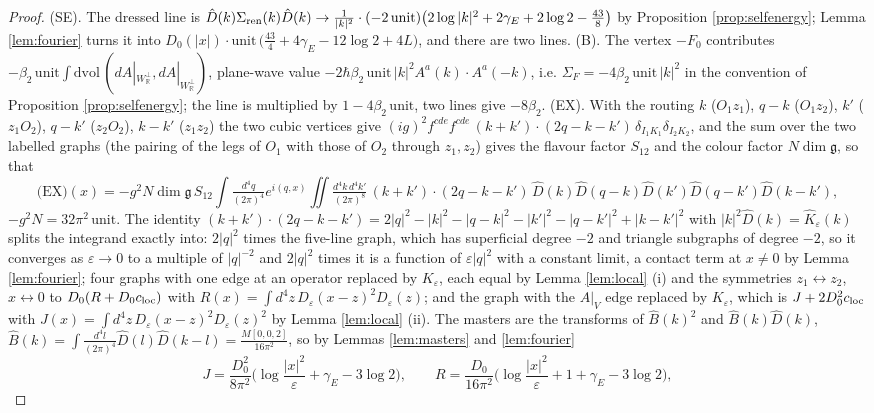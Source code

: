 \documentclass[11pt]{article}
\theoremstyle{plain}
\theoremstyle{definition}
\numberwithin{equation}{section}
\newcommand{\Wp}{W_{\mathbb R}^\perp}
\begin{document}
\begin{proof}
(SE). The dressed line is $\hat D(k)\Sigma_{\rm ren}(k)\hat D(k)\to\frac{1}{|k|^2}\cdot(-2\,\mathrm{unit})\big(2\log|k|^2+2\gamma_E+2\log2-\tfrac{43}8\big)$ by Proposition \ref{prop:selfenergy}; Lemma \ref{lem:fourier} turns it into $D_0(|x|)\cdot\mathrm{unit}\,\big(\tfrac{43}4+4\gamma_E-12\log2+4L\big)$, and there are two lines. (B). The vertex $-F_0$ contributes $-\beta_2\,\mathrm{unit}\int\mathrm{dvol}\,(dA|_{\Wp},dA|_{\Wp})$, plane-wave value $-2\hbar\beta_2\,\mathrm{unit}\,|k|^2A^a(k)\cdot A^a(-k)$, i.e. $\Sigma_F=-4\beta_2\,\mathrm{unit}\,|k|^2$ in the convention of Proposition \ref{prop:selfenergy}; the line is multiplied by $1-4\beta_2\,\mathrm{unit}$, two lines give $-8\beta_2$. (EX). With the routing $k$ ($O_1z_1$), $q-k$ ($O_1z_2$), $k'$ ($z_1O_2$), $q-k'$ ($z_2O_2$), $k-k'$ ($z_1z_2$) the two cubic vertices give $(ig)^2f^{cde}f^{cde}\,(k+k')\cdot(2q-k-k')\,\delta_{I_1K_1}\delta_{I_2K_2}$, and the sum over the two labelled graphs (the pairing of the legs of $O_1$ with those of $O_2$ through $z_1,z_2$) gives the flavour factor $S_{12}$ and the colour factor $N\dim\mathfrak g$, so that
\[
\text{(EX)}(x)=-g^2N\dim\mathfrak g\,S_{12}\int\tfrac{d^4q}{(2\pi)^4}e^{i(q,x)}\iint\tfrac{d^4k\,d^4k'}{(2\pi)^8}\,(k+k')\cdot(2q-k-k')\,\hat D(k)\hat D(q-k)\hat D(k')\hat D(q-k')\hat D(k-k'),
\]
$-g^2N=32\pi^2\,\mathrm{unit}$. The identity $(k+k')\cdot(2q-k-k')=2|q|^2-|k|^2-|q-k|^2-|k'|^2-|q-k'|^2+|k-k'|^2$ with $|k|^2\hat D(k)=\hat K_\varepsilon(k)$ splits the integrand exactly into: $2|q|^2$ times the five-line graph, which has superficial degree $-2$ and triangle subgraphs of degree $-2$, so it converges as $\varepsilon\to0$ to a multiple of $|q|^{-2}$ and $2|q|^2$ times it is a function of $\varepsilon|q|^2$ with a constant limit, a contact term at $x\ne0$ by Lemma \ref{lem:fourier}; four graphs with one edge at an operator replaced by $K_\varepsilon$, each equal by Lemma \ref{lem:local} (i) and the symmetries $z_1\leftrightarrow z_2$, $x\leftrightarrow0$ to $D_0(R+D_0c_{\rm loc})$ with $R(x)=\int d^4z\,D_\varepsilon(x-z)^2D_\varepsilon(z)$; and the graph with the $A|_V$ edge replaced by $K_\varepsilon$, which is $J+2D_0^2c_{\rm loc}$ with $J(x)=\int d^4z\,D_\varepsilon(x-z)^2D_\varepsilon(z)^2$ by Lemma \ref{lem:local} (ii). The masters are the transforms of $\hat B(k)^2$ and $\hat B(k)\hat D(k)$, $\hat B(k)=\int\frac{d^4l}{(2\pi)^4}\hat D(l)\hat D(k-l)=\frac{M[0,0,2]}{16\pi^2}$, so by Lemmas \ref{lem:masters} and \ref{lem:fourier}
\[
J=\frac{D_0^2}{8\pi^2}\Big(\log\frac{|x|^2}{\varepsilon}+\gamma_E-3\log2\Big),\qquad R=\frac{D_0}{16\pi^2}\Big(\log\frac{|x|^2}{\varepsilon}+1+\gamma_E-3\log2\Big),
\]
\end{proof}
\end{document}
